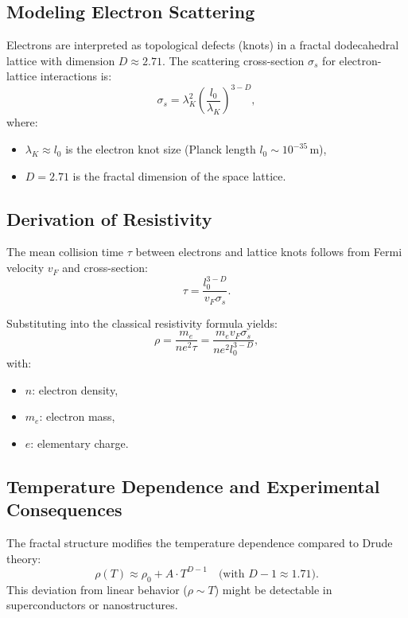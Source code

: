 \subsection{Modeling Electron Scattering}
Electrons are interpreted as topological defects (knots) in a fractal dodecahedral lattice with dimension $D \approx 2.71$. The scattering cross-section $\sigma_s$ for electron-lattice interactions is:
\begin{equation}
\sigma_s = \lambda_K^2 \left(\frac{l_0}{\lambda_K}\right)^{3-D},
\end{equation}
where:
\begin{itemize}
\item $\lambda_K \approx l_0$ is the electron knot size (Planck length $l_0 \sim 10^{-35}$\,m),
\item $D = 2.71$ is the fractal dimension of the space lattice.
\end{itemize}

\subsection{Derivation of Resistivity}
The mean collision time $\tau$ between electrons and lattice knots follows from Fermi velocity $v_F$ and cross-section:
\begin{equation}
\tau = \frac{l_0^{3-D}}{v_F \sigma_s}.
\end{equation}

Substituting into the classical resistivity formula yields:
\begin{equation}
\rho = \frac{m_e}{n e^2 \tau} = \frac{m_e v_F \sigma_s}{n e^2 l_0^{3-D}},
\end{equation}
with:
\begin{itemize}
\item $n$: electron density,
\item $m_e$: electron mass,
\item $e$: elementary charge.
\end{itemize}

\subsection{Temperature Dependence and Experimental Consequences}
The fractal structure modifies the temperature dependence compared to Drude theory:
\begin{equation}
\rho(T) \approx \rho_0 + A \cdot T^{D-1} \quad \text{(with } D-1 \approx 1.71\text{)}.
\end{equation}
This deviation from linear behavior ($\rho \sim T$) might be detectable in superconductors or nanostructures.
